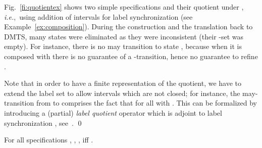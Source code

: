 \documentclass[twocolumn]{svjour3-dummy}
\newcommand*\ie{\textit{i.e.},}
\begin{document}
\begin{example}
  Fig.~\ref{fi:quotientex} shows two simple specifications and their
  quotient under , \ie~using addition of intervals for
  label synchronization (see Example~\ref{ex:composition}).  During
  the construction and the translation back to DMTS, many states were
  eliminated as they were inconsistent (their -set was
  empty). For instance, there is no may transition to state
  , because when it is composed with  there is no
  guarantee of a -transition, hence no guarantee to refine
  .

  Note that in order to have a finite representation of the quotient,
  we have to extend the label set to allow intervals which are not
  closed; for instance, the may-transition  from  to  comprises the fact
  that  for all  with .  This can be formalized by introducing a
  (partial) \emph{label quotient} operator  which is adjoint to label
  synchronization ,
  see~\cite{DBLP:journals/acta/FahrenbergL14}. \qed
\end{example}

\begin{theorem}
  \label{th:quotient-bool}
  For all specifications , , ,  iff .
\end{theorem}
\end{document}
